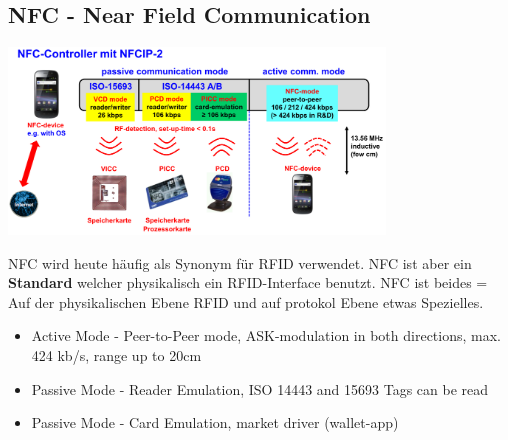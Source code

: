 \subsection{NFC - Near Field Communication}
	
	\begin{minipage}{10cm}
		\includegraphics[width=10cm]{./bilder/rfid-nfc.png} 
	\end{minipage}
			
	NFC wird heute häufig als Synonym für RFID verwendet. NFC ist aber ein \textbf{Standard} welcher physikalisch ein RFID-Interface benutzt. 
	NFC ist beides = Auf der physikalischen Ebene RFID und auf protokol Ebene etwas Spezielles.
	\begin{itemize}
		\item Active Mode - Peer-to-Peer mode, ASK-modulation in both directions, max. 424 kb/s, range up to 20cm
		\item Passive Mode - Reader Emulation, ISO 14443 and 15693 Tags can be read
		\item Passive Mode - Card Emulation, market driver (wallet-app)
	\end{itemize}
	
	
